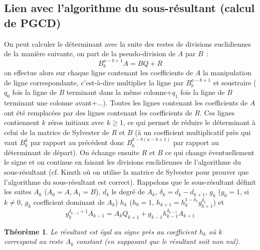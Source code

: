 \documentclass[a4paper,11pt]{article}
\newtheorem{thm}{Théorème}
\begin{document}
\subsection{Lien avec l'algorithme du sous-résultant (calcul de PGCD)}
On peut calculer le déterminant avec la suite des restes de divisions
euclidiennes de la manière suivante, on part de la pseudo-division
de $A$ par $B$~:
\[ B_b^{a-b+1} A=BQ+R \]
on effectue alors sur chaque ligne contenant les coefficients de $A$
la manipulation de ligne correspondante, c'est-à-dire multiplier
la ligne par $B_b^{a-b+1}$ et soustraire ($q_0$ fois la ligne
de $B$ terminant dans la même colonne+$q_1$ fois la ligne
de $B$ terminant une colonne avant+...). Toutes les lignes
contenant les coefficients de $A$ ont été remplacées par des lignes 
contenant les coefficients de $R$. Ces lignes contiennent $k$ zéros initiaux
avec $k \geq 1$, ce qui permet de réduire le déterminant à celui
de la matrice de Sylvester de $R$ et $B$ (à un coefficient multiplicatif
près qui vaut $B_b^k$ par rapport au précédent donc
$B_b^{k-b(a-b+1)}$ par rapport au déterminant de départ). 
On échange ensuite $R$ et $B$ ce qui change
éventuellement le signe et on continue en faisant les
divisions euclidiennes de l'algorithme du sous-r\'esultant (cf.
Knuth o\`u on utilise la matrice de Sylvester pour prouver que
l'algorithme du sous-r\'esultant est correct). Rappelons que
le sous-résultant définit les suites $A_k$ ($A_0=A, A_1=B$),
$d_k$ le degré de $A_k$, $\delta_k=d_k-d_{k+1}$,
$g_k$ ($g_0=1$, si $k\neq 0$, $g_k$ coefficient dominant de $A_k$) 
$h_k$ ($h_0=1$, $h_{k+1}=h_k^{1-\delta_k} g_{k+1}^{\delta_k}$) et
\[ g_k^{\delta_{k-1}+1} A_{k-1} = A_k Q_{k+1} + 
g_{k-1} h_{k-1}^{\delta_{k-1}} A_{k+1} \]
\begin{thm}
Le résultant est égal au signe près au coefficient $h_k$ où $k$
correspond au reste $A_k$ constant (en supposant que le résultant
soit non nul).
\end{thm}
\end{document}
